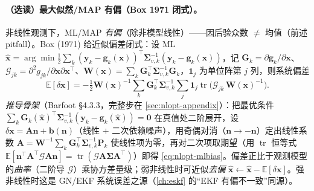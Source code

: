 \paragraph{（选读）最大似然/MAP 有偏（Box 1971 闭式）。}\cite{barfoot2024state}
非线性观测下，ML/MAP \emph{有偏}（除非模型线性）——因后验众数 $\neq$ 均值（前述 pitfall）。Box (1971) 给近似偏差闭式：设 ML $\hat{\mathbf{x}}=\arg\min\tfrac12\sum_k(\mathbf{y}_k-\mathbf{g}_k(\mathbf{x}))^\top\boldsymbol{\Sigma}_{v,k}^{-1}(\mathbf{y}_k-\mathbf{g}_k(\mathbf{x}))$，记 $\mathbf{G}_k=\partial\mathbf{g}_k/\partial\mathbf{x}$、$\boldsymbol{\mathcal{G}}_{jk}=\partial^2 g_{jk}/\partial\mathbf{x}\partial\mathbf{x}^\top$、$\mathbf{W}(\mathbf{x})=\sum_k\mathbf{G}_k^\top\boldsymbol{\Sigma}_{v,k}^{-1}\mathbf{G}_k$，$\mathbf{1}_j$ 为单位阵第 $j$ 列，则系统偏差
\begin{equation}
  \mathbb{E}[\delta\mathbf{x}]=-\tfrac12\mathbf{W}(\mathbf{x})^{-1}\sum_k\mathbf{G}_k^\top\boldsymbol{\Sigma}_{v,k}^{-1}\sum_j\mathbf{1}_j\operatorname{tr}\!\big(\boldsymbol{\mathcal{G}}_{jk}\,\mathbf{W}(\mathbf{x})^{-1}\big).
  \label{eq:nlopt-mlbias}
\end{equation}
\emph{推导骨架}（Barfoot\cite{barfoot2024state} §4.3.3，完整步在 \cref{sec:nlopt-appendix}）：把最优条件 $\sum_k\mathbf{G}_k(\hat{\mathbf{x}})^\top\boldsymbol{\Sigma}_{v,k}^{-1}(\mathbf{y}_k-\mathbf{g}_k(\hat{\mathbf{x}}))=\mathbf{0}$ 在真值处二阶展开，设 $\delta\mathbf{x}=\mathbf{A}\mathbf{n}+\mathbf{b}(\mathbf{n})$（线性 $+$ 二次依赖噪声），用奇偶对消（$\mathbf{n}\to-\mathbf{n}$）定出线性系数 $\mathbf{A}=\mathbf{W}^{-1}\sum_k\mathbf{G}_k^\top\boldsymbol{\Sigma}_{v,k}^{-1}\mathbf{P}_k$ 使线性项为零，再对二次项取期望（用 $\operatorname{tr}$ 恒等式 $\mathbb{E}[\mathbf{n}^\top\mathbf{A}^\top\boldsymbol{\mathcal{G}}\mathbf{A}\mathbf{n}]=\operatorname{tr}(\boldsymbol{\mathcal{G}}\mathbf{A}\boldsymbol{\Sigma}\mathbf{A}^\top)$）即得 \cref{eq:nlopt-mlbias}。偏差正比于观测模型的\emph{曲率}（二阶导 $\boldsymbol{\mathcal{G}}$）乘协方差量级；弱非线性时可近似\emph{去偏} $\hat{\mathbf{x}}\leftarrow\hat{\mathbf{x}}-\mathbb{E}[\delta\mathbf{x}]$。强非线性时这是 GN/EKF 系统误差之源（\cref{ch:eskf} 的“EKF 有偏不一致”同源）。

